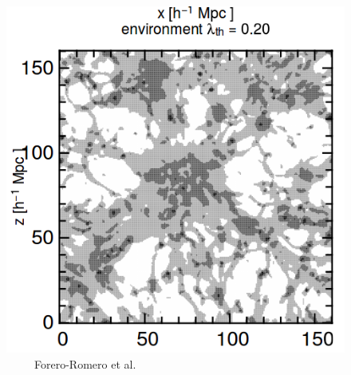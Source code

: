\documentclass[xcolor=dvipsnames]{beamer}
\begin{document}
\begin{frame}
\begin{figure}[ht]
\begin{minipage}[b]{0.45\linewidth}
        \end{minipage}
        \hspace{0.5cm}
        \begin{minipage}[b]{0.45\linewidth}
            \centering
            \includegraphics[width=\textwidth]{tweb2}
            {\tiny \ \ \ \ \ Forero-Romero et al. \cite{jones}}
        \end{minipage}
    \end{figure}
\end{frame}
\end{document}
